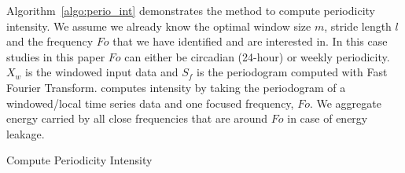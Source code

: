 \documentclass[preprints,article,accept,pdftex,moreauthors]{Definitions/mdpi}
\begin{document}
{Algorithm~\ref{algo:perio_int} demonstrates the method to compute periodicity intensity. We assume we already know the optimal window size $m$, stride length $l$ and the frequency $Fo$ that we have identified and are interested in. In this case studies in this paper $Fo$ can either be circadian (24-hour) or weekly periodicity. $X_w$ is the windowed input data and $S_f$ is the periodogram computed with Fast Fourier Transform. \intfunc computes intensity by taking the periodogram of a windowed/local time series data and one focused frequency, $Fo$. We aggregate energy carried by all close frequencies that are around $Fo$ in case of energy leakage.}
\begin{algorithm}[h]



    \caption{{Compute Periodicity Intensity}}
    \label{algo:perio_int}
    
\end{algorithm}
\end{document}
